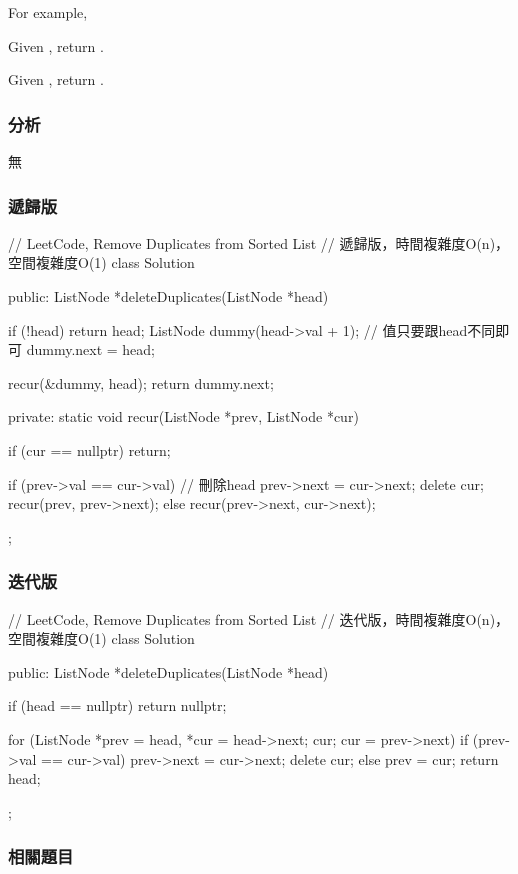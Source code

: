 For example,

Given , return .

Given , return .


\subsubsection{分析}
無


\subsubsection{遞歸版}
\begin{Code}
// LeetCode, Remove Duplicates from Sorted List
// 遞歸版，時間複雜度O(n)，空間複雜度O(1)
class Solution {
public:
    ListNode *deleteDuplicates(ListNode *head) {
        if (!head) return head;
        ListNode dummy(head->val + 1); // 值只要跟head不同即可
        dummy.next = head;

        recur(&dummy, head);
        return dummy.next;
    }
private:
    static void recur(ListNode *prev, ListNode *cur) {
        if (cur == nullptr) return;

        if (prev->val == cur->val) { // 刪除head
            prev->next = cur->next;
            delete cur;
            recur(prev, prev->next);
        } else {
            recur(prev->next, cur->next);
        }
    }
};
\end{Code}


\subsubsection{迭代版}
\begin{Code}
// LeetCode, Remove Duplicates from Sorted List
// 迭代版，時間複雜度O(n)，空間複雜度O(1)
class Solution {
public:
    ListNode *deleteDuplicates(ListNode *head) {
        if (head == nullptr) return nullptr;

        for (ListNode *prev = head, *cur = head->next; cur; cur = prev->next) {
            if (prev->val == cur->val) {
                prev->next = cur->next;
                delete cur;
            } else {
                prev = cur;
            }
        }
        return head;
    }
};
\end{Code}


\subsubsection{相關題目}

